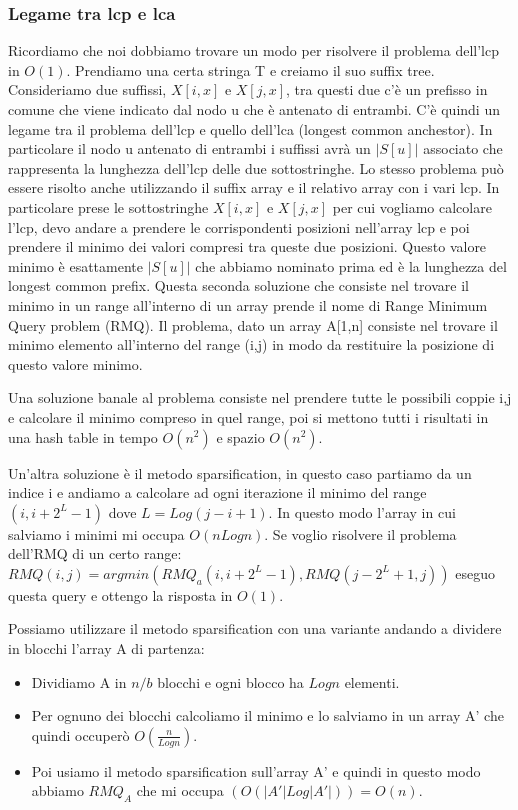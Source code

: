 \documentclass[14pt]{extreport}
\begin{document}
\subsubsection{Legame tra lcp e lca}

Ricordiamo che noi dobbiamo trovare un modo per risolvere il problema dell'lcp in $O(1)$.
Prendiamo una certa stringa T e creiamo il suo suffix tree. Consideriamo due suffissi, $X[i,x]$ e $X[j,x]$, tra questi due c'è un prefisso in comune che viene indicato dal nodo u che è antenato di entrambi. C'è quindi un legame tra il problema dell'lcp e quello dell'lca (longest common anchestor). In particolare il nodo u antenato di entrambi i suffissi avrà un $|S[u]|$ associato che rappresenta la lunghezza dell'lcp delle due sottostringhe.
Lo stesso problema può essere risolto anche utilizzando il suffix array e il relativo array con i vari lcp. In particolare prese le sottostringhe $X[i,x]$ e $X[j,x]$ per cui vogliamo calcolare l'lcp, devo andare a prendere le corrispondenti posizioni nell'array lcp e poi prendere il minimo dei valori compresi tra queste due posizioni.
Questo valore minimo è esattamente $|S[u]|$ che abbiamo nominato prima ed è la lunghezza del longest common prefix.
Questa seconda soluzione che consiste nel trovare il minimo in un range all'interno di un array prende il nome di Range Minimum Query problem (RMQ).
Il problema, dato un array A[1,n] consiste nel trovare il minimo elemento all'interno del range (i,j) in modo da restituire la posizione di questo valore minimo.

Una soluzione banale al problema consiste nel prendere tutte le possibili coppie i,j e calcolare il minimo compreso in quel range, poi si mettono tutti i risultati in una hash table in tempo $O(n^2)$ e spazio $O(n^2)$.

Un'altra soluzione è il metodo sparsification, in questo caso partiamo da un indice i e andiamo a calcolare ad ogni iterazione il minimo del range $(i,i+2^L-1)$ dove $L=Log(j-i+1)$. In questo modo l'array in cui salviamo i minimi mi occupa $O(nLogn)$.
Se voglio risolvere il problema dell'RMQ di un certo range:
$RMQ(i,j)=argmin(RMQ_a(i,i+2^L-1),RMQ(j-2^L+1,j))$ eseguo questa query e ottengo la risposta in $O(1)$.

Possiamo utilizzare il metodo sparsification con una variante andando a dividere in blocchi l'array A di partenza:
\begin{itemize}
\item Dividiamo A in $n/b$ blocchi e ogni blocco ha $Logn$ elementi.
\item Per ognuno dei blocchi calcoliamo il minimo e lo salviamo in un array A' che quindi occuperò $O(\frac{n}{Logn})$.
\item Poi usiamo il metodo sparsification sull'array A' e quindi in questo modo abbiamo $RMQ_A$ che mi occupa $(O(|A'|Log|A'|)) = O(n)$.
\end{itemize}
\end{document}
